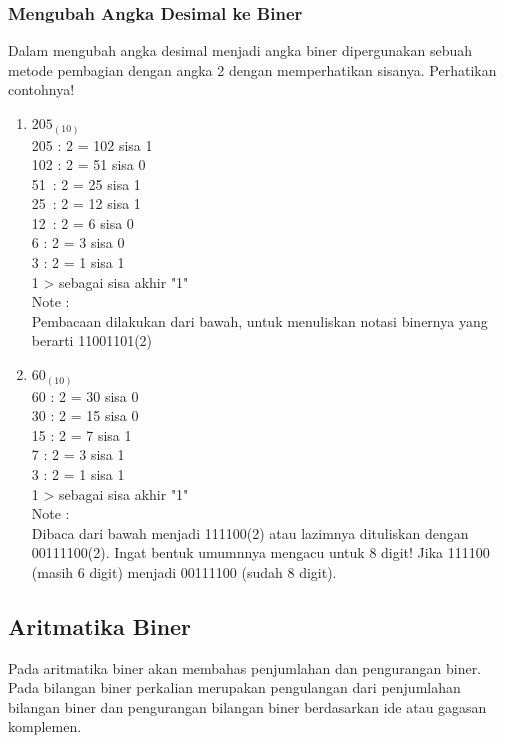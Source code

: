 \begin{enumerate}[label=(\alph*)]
\subsubsection {Mengubah Angka Desimal ke Biner} 

\qquad Dalam mengubah angka desimal menjadi angka biner dipergunakan sebuah metode pembagian dengan angka 2 dengan memperhatikan sisanya. 
Perhatikan contohnya! 
\begin{enumerate}
\item $205_{(10)}$\\
205 : 2 = 102 sisa 1\\ 
102 : 2 = 51 sisa 0 \\
51 \,: 2 = 25 sisa 1\\
25 \,: 2 = 12 sisa 1 \\
12 \,: 2 = 6 sisa 0 \\
6 \quad : 2 = 3 sisa 0 \\
3 \quad : 2 = 1 sisa 1 \\
1 >  sebagai sisa akhir "1"\\

Note :\\
Pembacaan dilakukan dari bawah, untuk menuliskan notasi binernya yang berarti 11001101(2) \\

\item $60_{(10)}$\\
60 : 2 = 30 sisa 0\\ 
30 : 2 = 15 sisa 0 \\
15 : 2 = 7 sisa 1 \\
7 \: : 2 = 3 sisa 1 \\
3 \: : 2 = 1 sisa 1 \\
1 > sebagai sisa akhir "1"\\

Note :\\
Dibaca dari bawah menjadi 111100(2) atau lazimnya dituliskan dengan 00111100(2). Ingat bentuk umumnnya mengacu untuk 8 digit! Jika 111100 (masih 6 digit) menjadi 00111100 (sudah 8 digit).

\end{enumerate}

\subsection{Aritmatika Biner}

\qquad Pada aritmatika biner akan membahas penjumlahan dan pengurangan biner. Pada bilangan biner perkalian merupakan pengulangan dari penjumlahan bilangan biner dan pengurangan bilangan biner berdasarkan ide atau gagasan komplemen.


\end{enumerate}

